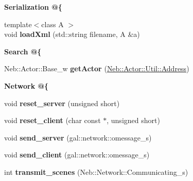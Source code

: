 \begin{Indent}{\bf Serialization @\{}\par
\begin{DoxyCompactItemize}
\item 
\hypertarget{classNeb_1_1App_1_1Base_aef5b0330ea53ea1ed0701cc86f0a6e02}{{\footnotesize template$<$class A $>$ }\\void {\bfseries load\-Xml} (std\-::string filename, A \&a)}\label{classNeb_1_1App_1_1Base_aef5b0330ea53ea1ed0701cc86f0a6e02}

\end{DoxyCompactItemize}
\end{Indent}
\begin{Indent}{\bf Search @\{}\par
\begin{DoxyCompactItemize}
\item 
\hypertarget{classNeb_1_1App_1_1Base_ab15cef6932ba3060d20244d65034e456}{Neb\-::\-Actor\-::\-Base\-\_\-w {\bfseries get\-Actor} (\hyperlink{classNeb_1_1Actor_1_1Util_1_1Address}{Neb\-::\-Actor\-::\-Util\-::\-Address})}\label{classNeb_1_1App_1_1Base_ab15cef6932ba3060d20244d65034e456}

\end{DoxyCompactItemize}
\end{Indent}
\begin{Indent}{\bf Network @\{}\par
\begin{DoxyCompactItemize}
\item 
\hypertarget{classNeb_1_1App_1_1Base_ab9d0a601ee3d27fdde0ae749688301bc}{void {\bfseries reset\-\_\-server} (unsigned short)}\label{classNeb_1_1App_1_1Base_ab9d0a601ee3d27fdde0ae749688301bc}

\item 
\hypertarget{classNeb_1_1App_1_1Base_a7dbb058185e79e6d9766c5bcba10ef94}{void {\bfseries reset\-\_\-client} (char const $\ast$, unsigned short)}\label{classNeb_1_1App_1_1Base_a7dbb058185e79e6d9766c5bcba10ef94}

\item 
\hypertarget{classNeb_1_1App_1_1Base_a63794136246ca794a014bc89f93b8da0}{void {\bfseries send\-\_\-server} (gal\-::network\-::omessage\-\_\-s)}\label{classNeb_1_1App_1_1Base_a63794136246ca794a014bc89f93b8da0}

\item 
\hypertarget{classNeb_1_1App_1_1Base_a01f7c70061935f52d5c60ec4ee568187}{void {\bfseries send\-\_\-client} (gal\-::network\-::omessage\-\_\-s)}\label{classNeb_1_1App_1_1Base_a01f7c70061935f52d5c60ec4ee568187}

\item 
\hypertarget{classNeb_1_1App_1_1Base_a9e6d3043a77d97af9f7cbe326071c49d}{int {\bfseries transmit\-\_\-scenes} (Neb\-::\-Network\-::\-Communicating\-\_\-s)}\label{classNeb_1_1App_1_1Base_a9e6d3043a77d97af9f7cbe326071c49d}

\end{DoxyCompactItemize}
\end{Indent}
